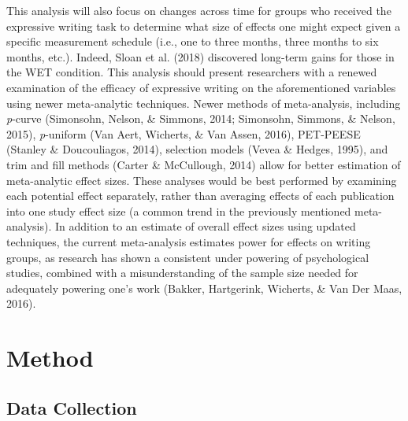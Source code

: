 \documentclass[man, mask]{apa6}
\theoremstyle{definition}
\theoremstyle{definition}
\theoremstyle{definition}
\theoremstyle{remark}
\begin{document}
This analysis will also focus on changes across time for groups who
received the expressive writing task to determine what size of effects
one might expect given a specific measurement schedule (i.e., one to
three months, three months to six months, etc.). Indeed, Sloan et al.
(2018) discovered long-term gains for those in the WET condition. This
analysis should present researchers with a renewed examination of the
efficacy of expressive writing on the aforementioned variables using
newer meta-analytic techniques. Newer methods of meta-analysis,
including \emph{p}-curve (Simonsohn, Nelson, \& Simmons, 2014;
Simonsohn, Simmons, \& Nelson, 2015), \emph{p}-uniform (Van Aert,
Wicherts, \& Van Assen, 2016), PET-PEESE (Stanley \& Doucouliagos,
2014), selection models (Vevea \& Hedges, 1995), and trim and fill
methods (Carter \& McCullough, 2014) allow for better estimation of
meta-analytic effect sizes. These analyses would be best performed by
examining each potential effect separately, rather than averaging
effects of each publication into one study effect size (a common trend
in the previously mentioned meta-analysis). In addition to an estimate
of overall effect sizes using updated techniques, the current
meta-analysis estimates power for effects on writing groups, as research
has shown a consistent under powering of psychological studies, combined
with a misunderstanding of the sample size needed for adequately
powering one's work (Bakker, Hartgerink, Wicherts, \& Van Der Maas,
2016).

\section{Method}\label{method}

\subsection{Data Collection}\label{data-collection}
\end{document}
